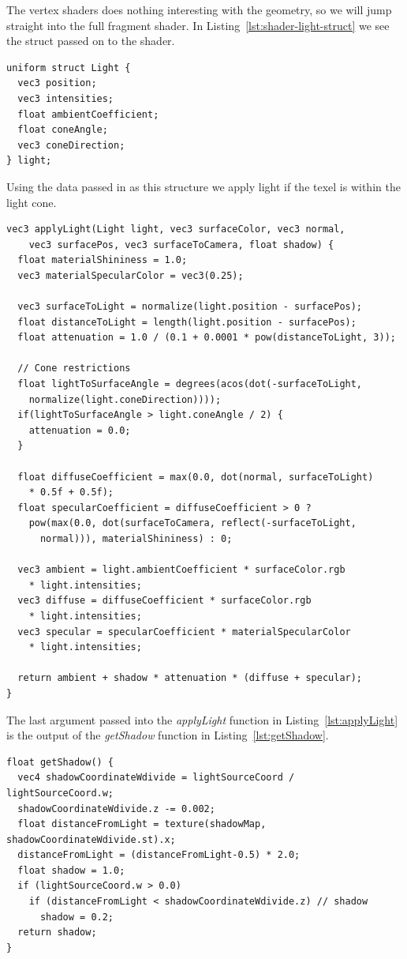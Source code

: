 \documentclass[a4paper,12pt]{article}
\begin{document}
The vertex shaders does nothing interesting with the geometry, so we will jump straight into the full fragment shader. In Listing~\ref{lst:shader-light-struct} we see the struct passed on to the shader.

\begin{lstlisting}[label=lst:shader-light-struct,caption= The light struct received in the shader.]
uniform struct Light {
  vec3 position;
  vec3 intensities;
  float ambientCoefficient;
  float coneAngle;
  vec3 coneDirection;
} light;
\end{lstlisting}

Using the data passed in as this structure we apply light if the texel is within the light cone.

\begin{lstlisting}[label=lst:applyLight,caption= Shader function for applying lighting]
vec3 applyLight(Light light, vec3 surfaceColor, vec3 normal,
    vec3 surfacePos, vec3 surfaceToCamera, float shadow) {
  float materialShininess = 1.0;
  vec3 materialSpecularColor = vec3(0.25);

  vec3 surfaceToLight = normalize(light.position - surfacePos);
  float distanceToLight = length(light.position - surfacePos);
  float attenuation = 1.0 / (0.1 + 0.0001 * pow(distanceToLight, 3));

  // Cone restrictions
  float lightToSurfaceAngle = degrees(acos(dot(-surfaceToLight,
    normalize(light.coneDirection))));
  if(lightToSurfaceAngle > light.coneAngle / 2) {
    attenuation = 0.0;
  }

  float diffuseCoefficient = max(0.0, dot(normal, surfaceToLight)
    * 0.5f + 0.5f);
  float specularCoefficient = diffuseCoefficient > 0 ?
    pow(max(0.0, dot(surfaceToCamera, reflect(-surfaceToLight,
      normal))), materialShininess) : 0;

  vec3 ambient = light.ambientCoefficient * surfaceColor.rgb
    * light.intensities;
  vec3 diffuse = diffuseCoefficient * surfaceColor.rgb
    * light.intensities;
  vec3 specular = specularCoefficient * materialSpecularColor
    * light.intensities;

  return ambient + shadow * attenuation * (diffuse + specular);
}
\end{lstlisting}

The last argument passed into the \emph{applyLight} function in Listing~\ref{lst:applyLight} is the output of the \emph{getShadow} function in Listing~\ref{lst:getShadow}.

\begin{lstlisting}[label=lst:getShadow,caption= The shader function figuring out whether the texel is in the shade.]
float getShadow() {
  vec4 shadowCoordinateWdivide = lightSourceCoord / lightSourceCoord.w;
  shadowCoordinateWdivide.z -= 0.002;
  float distanceFromLight = texture(shadowMap, shadowCoordinateWdivide.st).x;
  distanceFromLight = (distanceFromLight-0.5) * 2.0;
  float shadow = 1.0;
  if (lightSourceCoord.w > 0.0)
    if (distanceFromLight < shadowCoordinateWdivide.z) // shadow
      shadow = 0.2;
  return shadow;
}
\end{lstlisting}
\end{document}
